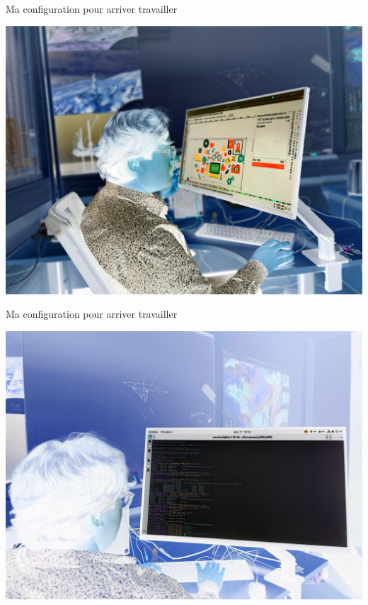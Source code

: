 \documentclass{beamer}
\begin{document}
\begin{frame}
 {Ma configuration pour arriver travailler}
 
  \includegraphics[width=1\linewidth]{images/photos/2/image4_neg.jpeg}  
 
\end{frame}


\begin{frame}
 {Ma configuration pour arriver travailler}
 
  \includegraphics[width=1\linewidth]{images/photos/5/image0_neg.jpeg}  
 
\end{frame}
\end{document}
